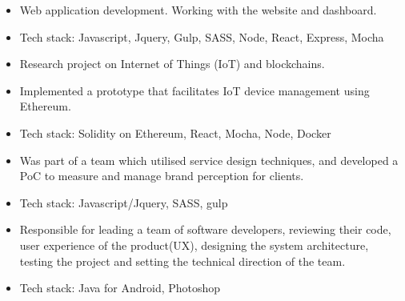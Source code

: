 \documentclass[10pt,a4paper]{altacv}
\begin{document}

\begin{fullwidth}
\makecvheader
\end{fullwidth}


\begin{itemize}
\item Web application development. Working with the website and dashboard.
\item Tech stack: Javascript, Jquery, Gulp, SASS, Node, React, Express, Mocha
\end{itemize}

\divider

\begin{itemize}
\item Research project on Internet of Things (IoT) and blockchains. 
\item Implemented a prototype that facilitates IoT device management using Ethereum.
\item Tech stack: Solidity on Ethereum, React, Mocha, Node, Docker
\end{itemize}

\divider

\begin{itemize}
\item Was part of a team which utilised service design techniques, and developed a PoC to measure and manage brand perception for clients. 
\item Tech stack: Javascript/Jquery, SASS, gulp
\end{itemize}
\divider


\begin{itemize}
\item Responsible for leading a team of software developers, reviewing their code, user experience of the product(UX), designing the system architecture, testing the project and setting the technical direction of the team.
\item Tech stack: Java for Android, Photoshop
\end{itemize}
\end{document}
